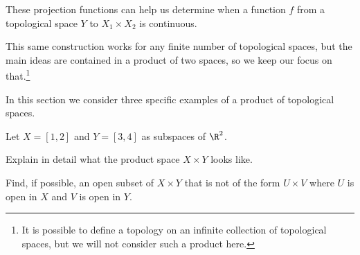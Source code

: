 These projection functions can help us determine when a function $f$ from a topological space $Y$ to $X_1 \times X_2$ is continuous.



This same construction works for any finite number of topological spaces, but the main ideas are contained in a product of two spaces, so we keep our focus on that.\footnote{It is possible to define a topology on an infinite collection of topological spaces, but we will not consider such a product here.}


 \label{sec_prod_top_ex}

In this section we consider three specific examples of a product of topological spaces. 

\begin{activity} Let $X = [1,2]$ and $Y = [3,4]$ as subspaces of $\R^2$. 
\ba
\item Explain in detail what the product space $X \times Y$ looks like. 

\item Find, if possible, an open subset of $X \times Y$ that is not of the form $U \times V$ where $U$ is open in $X$ and $V$ is open in $Y$.

\ea

\end{activity}

\begin{comment}

\ActivitySolution

\ba
\item The product space $X \times Y$ contains all points of the form $(x,y)$ with $1 \leq x \leq 2$ and $3 \leq y \leq 4$ in $\R^2$. This set of points is the rectangle in $\R^2$ with vertices $(1,3)$, $(2,3)$, $(1,4)$ and $(2,4)$. 

\item The set $O = \{(x,y) \mid 1.1 < x < 1.3, 3.1 < y < 3.3\} \cup \{(x,y) \mid 1.7< x < 1.9, 3.7 < y < 3.9\}$ is equal to $(B(1.2,0.1) \times B(3.2,0.1)) \cup ((B(1.8,0.1) \times B(3.8,0.1))$ and so is open in $X \times Y$. However, $O$ is not of the form $U \times V$ where $U$ is open in $X$ and $V$ is open in $Y$. To see why, suppose to the contrary that $O = U \times V$ for some $U$ open in $X$ and $V$ open in $Y$. Since the points $(x,y)$ in $O$ only have $x \in (1.1,1.3) \cup (1.7,1.9)$ and $y \in (3.1,3.3) \cup (3.7,3.9)$, it follows that $U = (1,1,1.3) \cup (1.7,1.9)$ and $V = (3.1,3.3) \cup (3.7,3.9)$. But then $(1.8, 3.2)$ is in $U \times V$. Since $(1.8, 3.2)$ is not in $O$, we conclude that $O$ is not of the for $U \times V$ with $U$ open in $X$ and $V$ open in $Y$.  

\ea


\end{comment}



